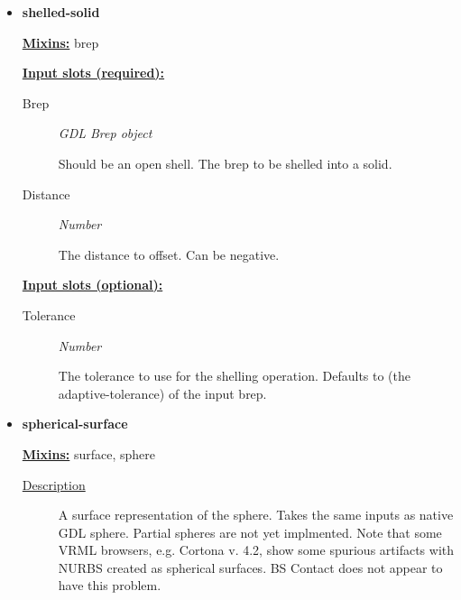 \documentclass [11pt]{book}
\begin{document}
\begin{itemize}
\item {}
\label{prim:shelled-solid}
\textbf{shelled-solid}


\textbf{
\underline{Mixins:}} brep





\textbf{
\underline{Input slots (required):}}

\begin{description}

\item [Brep]
\emph{GDL Brep object}

 Should be an open shell.
The brep to be shelled into a solid.




\item [Distance]
\emph{Number}

 The distance to offset. Can be negative.




\end{description}






\textbf{
\underline{Input slots (optional):}}

\begin{description}

\item [Tolerance]
\emph{Number}

 The tolerance to use for the shelling operation.
Defaults to (the adaptive-tolerance) of the input brep.




\end{description}







\item {}
\label{prim:spherical-surface}
\textbf{spherical-surface}


\textbf{
\underline{Mixins:}} surface, sphere





\begin{description}

\item [
\underline{Description}]


A surface representation of the sphere. Takes the same inputs as native GDL sphere. Partial spheres are not yet implmented.
Note that some VRML browsers, e.g. Cortona v. 4.2, show some spurious artifacts with NURBS 
created as spherical surfaces. BS Contact does not appear to have this problem.




\end{description}
\end{itemize}
\end{document}
